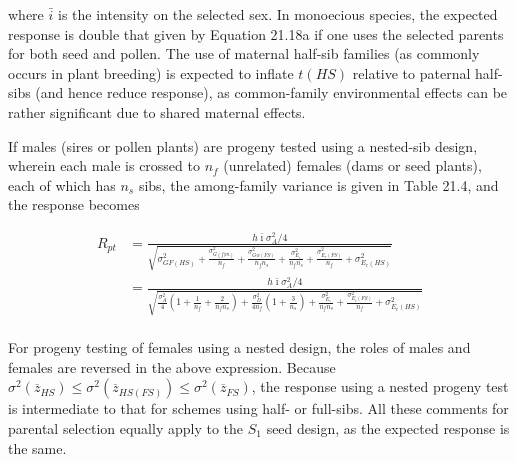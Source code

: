 \documentclass{article}
\begin{document}
where  $ \bar{i} $ is the intensity on the selected sex. In monoecious species, the expected response is double that given by Equation 21.18a if one uses the selected parents for both seed and pollen. The use of maternal half-sib families (as commonly occurs in plant breeding) is expected to inflate  $ t(HS) $ relative to paternal half-sibs (and hence reduce response), as common-family environmental effects can be rather significant due to shared maternal effects.

If males (sires or pollen plants) are progeny tested using a nested-sib design, wherein each male is crossed to  $ n_{f} $ (unrelated) females (dams or seed plants), each of which has  $ n_{s} $ sibs, the among-family variance is given in Table 21.4, and the response becomes

\begin{equation}
\begin{aligned}R_{pt}&=\frac{h\bar{\imath}\sigma_{A}^{2}/4}{\sqrt{\sigma_{GF(HS)}^{2}+\frac{\sigma_{G(f|m)}^{2}}{n_{f}}+\frac{\sigma_{Gw(FS)}^{2}}{n_{f}n_{s}}+\frac{\sigma_{E_{s}}^{2}}{n_{f}n_{s}}+\frac{\sigma_{E_{c}(FS)}^{2}}{n_{f}}+\sigma_{E_{c}(HS)}^{2}}}\\&=\frac{h\bar{\imath}\sigma_{A}^{2}/4}{\sqrt{\frac{\sigma_{A}^{2}}{4}\left(1+\frac{1}{n_{f}}+\frac{2}{n_{f}n_{s}}\right)+\frac{\sigma_{D}^{2}}{4n_{f}}\left(1+\frac{3}{n_{s}}\right)+\frac{\sigma_{E_{s}}^{2}}{n_{f}n_{s}}+\frac{\sigma_{E_{c}(FS)}^{2}}{n_{f}}+\sigma_{E_{c}(HS)}^{2}}}\\ \end{aligned}
\tag{21.18b}
\label{eq:21_18b}
\end{equation}

For progeny testing of females using a nested design, the roles of males and females are reversed in the above expression. Because  $ \sigma^2(\overline{z}_{HS}) \leq \sigma^2(\overline{z}_{HS(FS)}) \leq \sigma^2(\overline{z}_{FS}) $, the response using a nested progeny test is intermediate to that for schemes using half- or full-sibs. All these comments for parental selection equally apply to the  $ S_1 $ seed design, as the expected response is the same.
\end{document}
